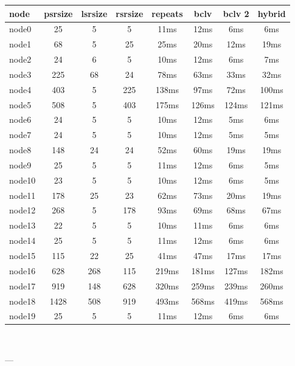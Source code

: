 

\begin{tabular}{|l|c|c|c|c|c|c|c|}
\hline node & psrsize & lsrsize & rsrsize   & repeats & bclv & bclv 2 & hybrid\\
    \hline node0 & 25 & 5 & 5 & 11ms & 12ms & 6ms & 6ms\\
    \hline node1 & 68 & 5 & 25 & 25ms & 20ms & 12ms & 19ms\\
    \hline node2 & 24 & 6 & 5 & 10ms & 12ms & 6ms & 7ms\\
    \hline node3 & 225 & 68 & 24 & 78ms & 63ms & 33ms & 32ms\\
    \hline node4 & 403 & 5 & 225 & 138ms & 97ms & 72ms & 100ms\\
    \hline node5 & 508 & 5 & 403 & 175ms & 126ms & 124ms & 121ms\\
    \hline node6 & 24 & 5 & 5 & 10ms & 12ms & 5ms & 6ms\\
    \hline node7 & 24 & 5 & 5 & 10ms & 12ms & 5ms & 5ms\\
    \hline node8 & 148 & 24 & 24 & 52ms & 60ms & 19ms & 19ms\\
    \hline node9 & 25 & 5 & 5 & 11ms & 12ms & 6ms & 5ms\\
    \hline node10 & 23 & 5 & 5 & 10ms & 12ms & 6ms & 5ms\\
    \hline node11 & 178 & 25 & 23 & 62ms & 73ms & 20ms & 19ms\\
    \hline node12 & 268 & 5 & 178 & 93ms & 69ms & 68ms & 67ms\\
    \hline node13 & 22 & 5 & 5 & 10ms & 11ms & 6ms & 6ms\\
    \hline node14 & 25 & 5 & 5 & 11ms & 12ms & 6ms & 6ms\\
    \hline node15 & 115 & 22 & 25 & 41ms & 47ms & 17ms & 17ms\\
    \hline node16 & 628 & 268 & 115 & 219ms & 181ms & 127ms & 182ms\\
    \hline node17 & 919 & 148 & 628 & 320ms & 259ms & 239ms & 260ms\\
    \hline node18 & 1428 & 508 & 919 & 493ms & 568ms & 419ms & 568ms\\
    \hline node19 & 25 & 5 & 5 & 11ms & 12ms & 6ms & 6ms\\

\hline
\end{tabular} \

---


